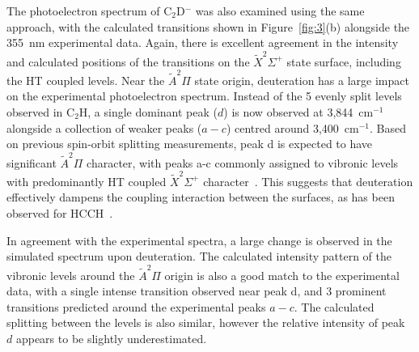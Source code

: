 \documentclass[journal=jpcafh,manuscript=article,layout=onecolumn, 12pt]{achemso}
\begin{document}
The photoelectron spectrum of C$_2$D$^-$ was also examined using the same approach, with the calculated transitions shown in Figure~\ref{fig:3}(b) alongside the 355~nm experimental data. Again, there is excellent agreement in the intensity and calculated positions of the transitions on the $\tilde{X} ^2\Sigma^+$ state surface, including the HT coupled levels. Near the $\tilde{A} ^2\Pi$ state origin, deuteration has a large impact on the experimental photoelectron spectrum. Instead of the 5 evenly split levels observed in C$_2$H, a single dominant peak ($d$) is now observed at 3,844~cm$^{-1}$ alongside a collection of weaker peaks ($a-c$) centred around 3,400~cm$^{-1}$. Based on previous spin-orbit splitting measurements, peak d is expected to have significant $\tilde{A} ^2\Pi$ character, with peaks a-c commonly assigned to vibronic levels with predominantly HT coupled $\tilde{X} ^2\Sigma^+$ character~\cite{yan87,hsu95,chi99,wil11}. This suggests that deuteration effectively dampens the coupling interaction between the surfaces, as has been observed for HCCH~\cite{dev17}.

In agreement with the experimental spectra, a large change is observed in the simulated spectrum upon deuteration. The calculated intensity pattern of the vibronic levels around the $\tilde{A} ^2\Pi$ origin is also a good match to the experimental data, with a single intense transition observed near peak d, and 3 prominent transitions predicted around the experimental peaks $a-c$. The calculated splitting between the levels is also similar, however the relative intensity of peak $d$ appears to be slightly underestimated. %
\end{document}
